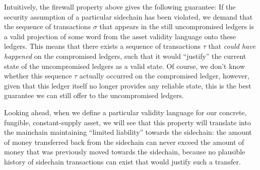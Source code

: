 Intuitively, the firewall property above gives the following guarantee:
If the security
assumption of a particular sidechain has been violated, we demand that the
sequence of transactions $\sigma$ that appears in the still uncompromised
ledgers is a valid projection of some word from the asset validity language onto
these ledgers. This means that there exists a sequence of transactions $\tau$
that \emph{could have happened} on the compromised ledgers, such that it would
``justify'' the current state of the uncompromised ledgers as a valid state.  Of
course, we don't know whether this sequence $\tau$ actually occurred on the
compromised ledger, however, given that this ledger itself no longer provides
any reliable state, this is the best guarantee we can still offer to the
uncompromised ledgers.

Looking ahead, when we define a particular validity language for our concrete,
fungible, constant-supply asset, we will see that this property will translate
into the mainchain maintaining ``limited liability'' towards the sidechain: the
amount of money transferred back from the sidechain can never exceed the amount
of money that was previously moved towards the sidechain, because no plausible
history of sidechain transactions can exist that would justify such a transfer.
